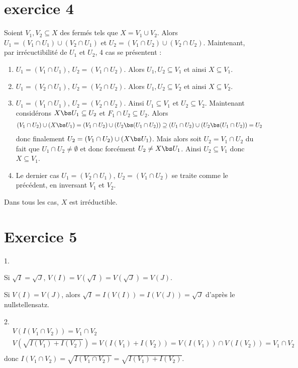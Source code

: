     \section{exercice 4}
        Soient $V_1, V_2 \subseteq X$ des fermés tels que $X = V_1 \cup V_2$. Alors $U_1 = (V_1 \cap U_1) \cup (V_2 \cap U_1)$ et $U_2 = (V_1 \cap U_2) \cup (V_2 \cap U_2)$. Maintenant, par irrécuctibilité de $U_1$ et $U_2$, 4 cas se présentent :
        \begin{enumerate}
            \item $U_1 = (V_1 \cap U_1)$, $U_2 = (V_1 \cap U_2)$. Alors $U_1, U_2 \subseteq V_1$ et ainsi $X \subseteq V_1$.
            \item $U_1 = (V_2 \cap U_1)$, $U_2 = (V_2 \cap U_2)$. Alors $U_1, U_2 \subseteq V_2$ et ainsi $X \subseteq V_2$.
            \item $U_1 = (V_1 \cap U_1)$, $U_2 = (V_2 \cap U_2)$. Ainsi $U_1 \subseteq V_1$ et $U_2 \subseteq V_2$. Maintenant considérons $X \bs U_1 \subseteq U_2$ et $F_1 \cap U_2 \subseteq U_2$. Alors
            \begin{align*}
                (V_1 \cap U_2) \cup (X \bs U_1) &= (V_1 \cap U_2) \cup (U_2 \bs (U_1 \cap U_2)) \supseteq (U_1 \cap U_2) \cup (U_2 \bs (U_1 \cap U_2)) = U_2
            \end{align*}
            donc finalement $U_2 = (V_1 \cap U_2) \cup (X \bs U_1)$. Mais alors soit $U_2 = V_1 \cap U_2$ du fait que $U_1 \cap U_2 \neq \emptyset$ et donc forcément $U_2 \neq X \bs U_1$. Ainsi $U_2 \subseteq V_1$ donc $X \subseteq V_1$.
            \item Le dernier cas $U_1 = (V_2 \cap U_1)$, $U_2 = (V_1 \cap U_2)$ se traite comme le précédent, en inversant $V_1$ et $V_2$.
        \end{enumerate}
        Dans tous les cas, $X$ est irréductible.

    \section{Exercice 5}
        \begin{question}{1.}
            \item Si $\sqrt{I} = \sqrt{J}$, $V(I) = V(\sqrt{I}) = V(\sqrt{J}) = V(J)$.
            \item Si $V(I) = V(J)$, alors $\sqrt{I} = I(V(I)) = I(V(J)) = \sqrt{J}$ d'après le nullstellensatz.
        \end{question}
        \begin{question}{2.}
            \begin{align*}
                &V(I(V_1 \cap V_2)) = V_1 \cap V_2 \\
                &V(\sqrt{I(V_1) + I(V_2)}) = V(I(V_1) + I(V_2)) = V(I(V_1)) \cap V(I(V_2)) = V_1 \cap V_2 \\
            \end{align*}
            donc $I(V_1 \cap V_2) = \sqrt{I(V_1 \cap V_2)} = \sqrt{I(V_1) + I(V_2)}$.
        \end{question}

